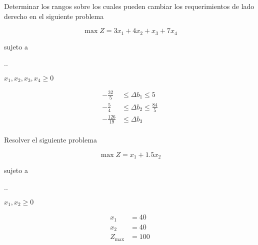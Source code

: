 \documentclass[../main.tex]{subfiles}
\begin{document}


\begin{questions}
\question %
Determinar los rangos sobre los cuales pueden cambiar los requerimientos de lado derecho en el siguiente problema


 \[\max Z = 3x_1 + 4x_2 + x_3 + 7x_4 \]

{\centering
sujeto a 

\sysdelim..%
%

\vspace{3mm}
$x_1, x_2, x_3, x_4 \geq 0$
\par}

\begin{solution}

    \begin{align*}
    -\frac{32}{5} & \leq \Delta b_1 \leq  5 \\[4mm]
    -\frac{5}{4}  &\leq \Delta b_2 \leq  \frac{84}{5} \\[4mm]
     -\frac{126}{19} & \leq \Delta b_3 \\
  \end{align*}
    
\end{solution}
    
\question %
Resolver el siguiente problema

\[\max Z = x_1 + 1.5x_2\]

{\centering
sujeto a 

\sysdelim..%
%

\vspace{3mm}
$x_1, x_2\geq 0$
\par}

\begin{solution}

  \begin{align*}
    x_1 & = 40\\
    x_2 & = 40 \\[2mm]
    Z_{\max} & = 100
  \end{align*}
\end{solution}

\end{questions}
\end{document}
